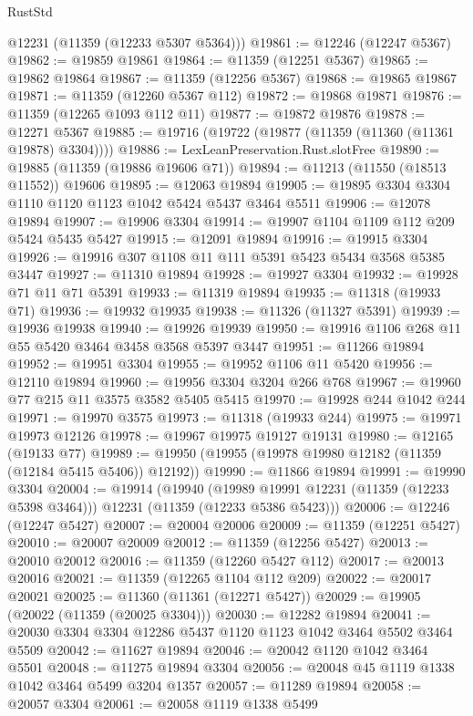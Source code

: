 \begin{lexlean}{RustStd}
\begin{coremodule}
{{{{{{{{{{{{{{{{{{{      @12231
      (@11359 (@12233 @5307 @5364)))
@19861 := @12246 (@12247 @5367)
@19862 := @19859 @19861
@19864 := @11359 (@12251 @5367)
@19865 := @19862 @19864
@19867 := @11359 (@12256 @5367)
@19868 := @19865 @19867
@19871 := @11359 (@12260 @5367 @112)
@19872 := @19868 @19871
@19876 := @11359 (@12265 @1093 @112 @11)
@19877 := @19872 @19876
@19878 := @12271 @5367
@19885 := @19716 (@19722 (@19877 (@11359 (@11360 (@11361 @19878) @3304))))
@19886 := LexLeanPreservation.Rust.slotFree
@19890 := @19885 (@11359 (@19886 @19606 @71))
@19894 := @11213 (@11550 (@18513 @11552)) @19606
@19895 := @12063 @19894
@19905 := @19895 @3304 @3304 @1110 @1120 @1123 @1042 @5424 @5437 @3464 @5511
@19906 := @12078 @19894
@19907 := @19906 @3304
@19914 := @19907 @1104 @1109 @112 @209 @5424 @5435 @5427
@19915 := @12091 @19894
@19916 := @19915 @3304
@19926 := @19916 @307 @1108 @11 @111 @5391 @5423 @5434 @3568 @5385 @3447
@19927 := @11310 @19894
@19928 := @19927 @3304
@19932 := @19928 @71 @11 @71 @5391
@19933 := @11319 @19894
@19935 := @11318 (@19933 @71)
@19936 := @19932 @19935
@19938 := @11326 (@11327 @5391)
@19939 := @19936 @19938
@19940 := @19926 @19939
@19950 := @19916 @1106 @268 @11 @55 @5420 @3464 @3458 @3568 @5397 @3447
@19951 := @11266 @19894
@19952 := @19951 @3304
@19955 := @19952 @1106 @11 @5420
@19956 := @12110 @19894
@19960 := @19956 @3304 @3204 @266 @768
@19967 := @19960 @77 @215 @11 @3575 @3582 @5405 @5415
@19970 := @19928 @244 @1042 @244
@19971 := @19970 @3575
@19973 := @11318 (@19933 @244)
@19975 := @19971 @19973 @12126
@19978 := @19967 @19975 @19127 @19131
@19980 := @12165 (@19133 @77)
@19989 := @19950 (@19955 (@19978 @19980 @12182 (@11359 (@12184 @5415 @5406)) @12192))
@19990 := @11866 @19894
@19991 := @19990 @3304
@20004 := @19914
    (@19940
      (@19989 @19991 @12231 (@11359 (@12233 @5398 @3464)))
      @12231
      (@11359 (@12233 @5386 @5423)))
@20006 := @12246 (@12247 @5427)
@20007 := @20004 @20006
@20009 := @11359 (@12251 @5427)
@20010 := @20007 @20009
@20012 := @11359 (@12256 @5427)
@20013 := @20010 @20012
@20016 := @11359 (@12260 @5427 @112)
@20017 := @20013 @20016
@20021 := @11359 (@12265 @1104 @112 @209)
@20022 := @20017 @20021
@20025 := @11360 (@11361 (@12271 @5427))
@20029 := @19905 (@20022 (@11359 (@20025 @3304)))
@20030 := @12282 @19894
@20041 := @20030 @3304 @3304 @12286 @5437 @1120 @1123 @1042 @3464 @5502 @3464 @5509
@20042 := @11627 @19894
@20046 := @20042 @1120 @1042 @3464 @5501
@20048 := @11275 @19894 @3304
@20056 := @20048 @45 @1119 @1338 @1042 @3464 @5499 @3204 @1357
@20057 := @11289 @19894
@20058 := @20057 @3304
@20061 := @20058 @1119 @1338 @5499
}}}}}}}}}}}}}}}}}}}
\end{coremodule}
\end{lexlean}
